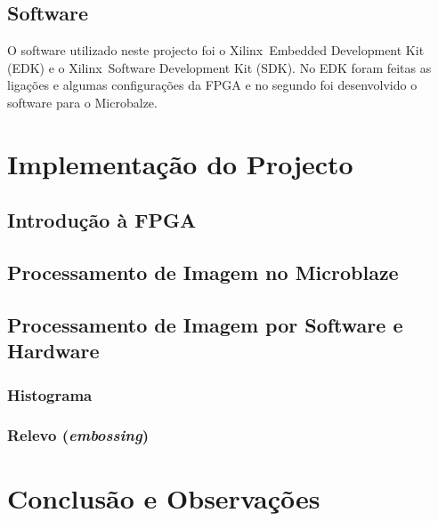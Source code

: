 \documentclass[a4paper]{article}
\begin{document}
\subsection*{Software}
O software utilizado neste projecto foi o Xilinx\textregistered\ Embedded Development Kit (EDK) e o Xilinx\textregistered\ Software Development Kit (SDK). No EDK foram feitas as ligações e algumas configurações da FPGA e no segundo foi desenvolvido o software para o Microbalze.

\section{Implementação do Projecto}
\subsection{Introdução à FPGA}
\label{subsec:LEDs}

\subsection{Processamento de Imagem no Microblaze\texttrademark}

\subsection{Processamento de Imagem por Software e Hardware}
\subsubsection{Histograma}

\subsubsection{Relevo (\textit{embossing})}

\section{Conclusão e Observações}


\nocite{}
\end{document}
